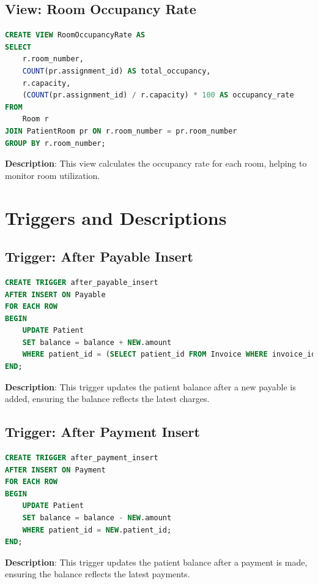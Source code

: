 \documentclass{article}
\begin{document}
\subsection{View: Room Occupancy Rate}
\begin{lstlisting}[language=SQL]
CREATE VIEW RoomOccupancyRate AS
SELECT 
    r.room_number,
    COUNT(pr.assignment_id) AS total_occupancy,
    r.capacity,
    (COUNT(pr.assignment_id) / r.capacity) * 100 AS occupancy_rate
FROM 
    Room r
JOIN PatientRoom pr ON r.room_number = pr.room_number
GROUP BY r.room_number;
\end{lstlisting}
\textbf{Description}: This view calculates the occupancy rate for each room, helping to monitor room utilization.

\section{Triggers and Descriptions}
\subsection{Trigger: After Payable Insert}
\begin{lstlisting}[language=SQL]
CREATE TRIGGER after_payable_insert
AFTER INSERT ON Payable
FOR EACH ROW
BEGIN
    UPDATE Patient
    SET balance = balance + NEW.amount
    WHERE patient_id = (SELECT patient_id FROM Invoice WHERE invoice_id = NEW.invoice_id);
END;
\end{lstlisting}
\textbf{Description}: This trigger updates the patient balance after a new payable is added, ensuring the balance reflects the latest charges.

\subsection{Trigger: After Payment Insert}
\begin{lstlisting}[language=SQL]
CREATE TRIGGER after_payment_insert
AFTER INSERT ON Payment
FOR EACH ROW
BEGIN
    UPDATE Patient
    SET balance = balance - NEW.amount
    WHERE patient_id = NEW.patient_id;
END;
\end{lstlisting}
\textbf{Description}: This trigger updates the patient balance after a payment is made, ensuring the balance reflects the latest payments.
\end{document}
